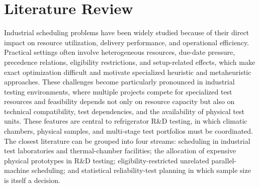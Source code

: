 \section{Literature Review}
\label{sec:literature_review}


Industrial scheduling problems have been widely studied because of their
direct impact on resource utilization, delivery performance, and operational
efficiency.
Practical settings often involve heterogeneous resources, due-date pressure,
precedence relations, eligibility restrictions, and setup-related effects,
which make exact optimization difficult and motivate specialized heuristic
and metaheuristic approaches.
These challenges become particularly pronounced in industrial testing
environments, where multiple projects compete for specialized test resources
and feasibility depends not only on resource capacity but also on technical
compatibility, test dependencies, and the availability of physical test units.
These features are central to refrigerator {R\&D} testing, in which climatic
chambers, physical samples, and multi-stage test portfolios must be
coordinated.
The closest literature can be grouped into four streams: scheduling in
industrial test laboratories and thermal-chamber facilities; the allocation
of expensive physical prototypes in {R\&D} testing; eligibility-restricted
unrelated parallel-machine scheduling; and statistical reliability-test
planning in which sample size is itself a decision.

